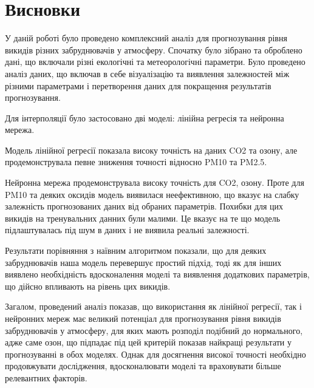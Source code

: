 \chapter{Висновки}

У даній роботі було проведено комплексний аналіз для прогнозування рівня викидів різних забруднювачів у атмосферу. 
Спочатку було зібрано та оброблено дані, що включали різні екологічні та метеорологічні параметри. 
Було проведено аналіз даних, що включав в себе візуалізацію та виявлення залежностей між різними параметрами і перетворення даних для покращення результатів прогнозування.

Для інтерполяції було застосовано дві моделі: лінійна регресія та нейронна мережа.

Модель лінійної регресії показала високу точність на даних CO2 та озону, але продемонструвала певне зниження точності відносно PM10 та PM2.5. 

Нейронна мережа продемонструвала високу точність для CO2, озону. 
Проте для PM10 та деяких оксидів модель виявилася неефективною, що вказує на слабку залежність прогнозованих даних від обраних параметрів. 
Похибки для цих викидів на тренувальних данних були малими. 
Це вказує на те що модель підлаштувалась під шум в даних і не виявила реальні залежності.

Результати порівняння з наївним алгоритмом показали, що для деяких забруднювачів наша модель перевершує простий підхід, тоді як для інших виявлено необхідність вдосконалення моделі та виявлення додаткових параметрів, що дійсно впливають на рівень цих викидів.

Загалом, проведений аналіз показав, що використання як лінійної регресії, так і нейронних мереж має великий потенціал для прогнозування рівня викидів забруднювачів у атмосферу, для яких мають розподіл подібний до нормального, адже саме озон, що підпадає під цей критерій показав найкращі результати у прогнозуванні в обох моделях. 
Однак для досягнення високої точності необхідно продовжувати дослідження, вдосконалювати моделі та враховувати більше релевантних факторів.